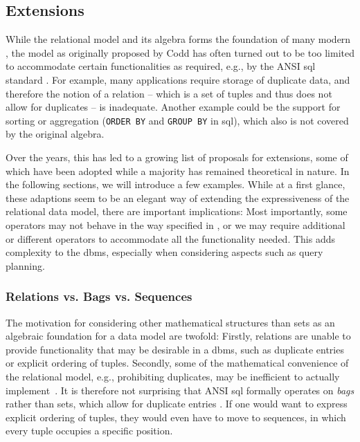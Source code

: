 \subsection{Extensions}
\label{section:rel_extensions}

While the relational model and its algebra forms the foundation of many modern , the model as originally proposed by Codd has often turned out to be too limited to accommodate certain functionalities as required, e.g., by the ANSI \acrshort{sql} standard \cite{Libkin:2003Expressive,XOpen:1996SQL}. For example, many applications require storage of duplicate data, and therefore the notion of a relation -- which is a set of tuples and thus does not allow for duplicates -- is inadequate. Another example could be the support for sorting or aggregation (\texttt{ORDER BY} and \texttt{GROUP BY} in \acrshort{sql}), which also is not covered by the original algebra.

Over the years, this has led to a growing list of proposals for extensions, some of which have been adopted while a majority has remained theoretical in nature. In the following sections, we will introduce a few examples. While at a first glance, these adaptions seem to be an elegant way of extending the expressiveness of the relational data model, there are important implications: Most importantly, some operators may not behave in the way specified in , or we may require additional or different operators to accommodate all the functionality needed. This adds complexity to the \acrshort{dbms}, especially when considering aspects such as query planning.

\subsubsection{Relations vs. Bags vs. Sequences}

The motivation for considering other mathematical structures than sets as an algebraic foundation for a data model are twofold: Firstly, relations are unable to provide functionality that may be desirable in a \acrshort{dbms}, such as duplicate entries or explicit ordering of tuples. Secondly, some of the mathematical convenience of the relational model, e.g., prohibiting duplicates, may be inefficient to actually implement~\cite{Garcia:2009Database}. It is therefore not surprising that ANSI \acrshort{sql}  \cite{XOpen:1996SQL} formally operates on \emph{bags} rather than sets, which allow for duplicate entries \cite{Garcia:2009Database,Chamberlin:2012Early}. If one would want to express explicit ordering of tuples, they would even have to move to sequences, in which every tuple occupies a specific position.

